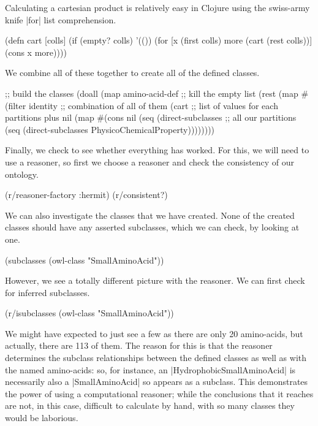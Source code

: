 Calculating a cartesian product is relatively easy in Clojure using the
swiss-army knife |for| list comprehension.

\begin{tawny}
(defn cart [colls]
  (if (empty? colls)
    '(())
    (for [x (first colls)
          more (cart (rest colls))]
      (cons x more))))
\end{tawny}

We combine all of these together to create all of the defined classes.

\begin{tawny}
;; build the classes
(doall
 (map
  amino-acid-def
  ;; kill the empty list
  (rest
   (map
    #(filter identity %
    ;; combination of all of them
    (cart
     ;; list of values for each partitions plus nil
     (map
      #(cons nil (seq (direct-subclasses %
      ;; all our partitions
      (seq (direct-subclasses PhysicoChemicalProperty))))))))
\end{tawny}

Finally, we check to see whether everything has worked. For this, we will need
to use a reasoner, so first we choose a reasoner and check the consistency of
our ontology.

\begin{tawny}
(r/reasoner-factory :hermit)
(r/consistent?)
\end{tawny}

We can also investigate the classes that we have created. None of the created classes
should have any asserted subclasses, which we can check, by looking at one.

\begin{tawny}
(subclasses
 (owl-class "SmallAminoAcid"))
\end{tawny}

However, we see a totally different picture with the reasoner. We can first
check for inferred subclasses.

\begin{tawny}
(r/isubclasses
 (owl-class "SmallAminoAcid"))
\end{tawny}

We might have expected to just see a few as there are only 20 amino-acids, but
actually, there are 113 of them. The reason for this is that the reasoner
determines the subclass relationships between the defined classes as well as
with the named amino-acids: so, for instance, an |HydrophobicSmallAminoAcid|
is necessarily also a |SmallAminoAcid| so appears as a subclass. This
demonstrates the power of using a computational reasoner; while the
conclusions that it reaches are not, in this case, difficult to calculate by
hand, with so many classes they would be laborious.

